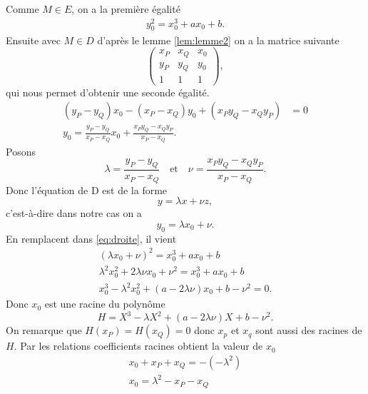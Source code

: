 \begin{demonstration}
\begin{description}
\begin{description}
            Comme $M \in E$, on a la première égalité
            \begin{align}
                \label{eq:droite} 
             y_0^2 = x_0^3 + ax_0 + b 
            .\end{align}
            Ensuite avec $M \in D$ d'après le lemme \ref{lem:lemme2}  on a la matrice suivante
            \[
                \begin{pmatrix}
                    x_P & x_Q & x_0 \\
                    y_P & y_Q & y_0  \\
                    1   & 1   & 1
                \end{pmatrix}
            ,\] 
           qui nous permet d'obtenir une seconde égalité.
           \begin{align*}
               \left( y_P - y_Q \right)x_0 - \left( x_P - x_Q \right)y_0 + \left( x_P y_Q - x_Q y_P \right) &= 0 \\
               y_0 = \frac{y_P - y_Q}{x_P - x_Q}x_0 + \frac{x_P y_Q - x_Q y_P}{x_P - x_Q}
           .\end{align*}
           Posons 
           \[
           \lambda = \frac{y_P - y_Q}{x_P - x_Q} \quad \text{et} \quad \nu = \frac{x_P y_Q - x_Q y_P}{x_P - x_Q}
           .\] 
           Donc l'équation de D est de la forme
           \[
           y = \lambda x + \nu z
           ,\] 
           c'est-à-dire dans notre cas on a
           \[
           y_0 = \lambda x_0 + \nu
           .\] 
           En remplacent dans \eqref{eq:droite}, il vient
           \begin{align*}
               \left( \lambda x_0 + \nu  \right)^2 = x_0^3 + ax_0 + b \\
               \lambda^2 x_0^2 + 2\lambda \nu x_0 + \nu^2 = x_0^3 + ax_0 + b \\
               x_0^3 - \lambda^2 x_0^2 + \left( a - 2\lambda \nu  \right)x_0 + b - \nu^2 = 0
           .\end{align*}
           Donc $x_0$ est une racine du polynôme
            \[
           H = X^3 - \lambda X^2 + \left( a - 2\lambda\nu \right)X + b - \nu^2
           .\] 
           On remarque que $H(x_P) = H(x_Q) = 0$ donc $x_p$ et $x_q$ sont aussi des racines de $H$.
           Par les relations coefficients racines obtient la valeur de $x_0$
           \begin{align*}
               x_0 + x_P + x_Q = - \left( - \lambda^2 \right) \\
               x_0 = \lambda^2 - x_P - x_Q

\end{align*}
\end{description}
\end{description}
\end{demonstration}
